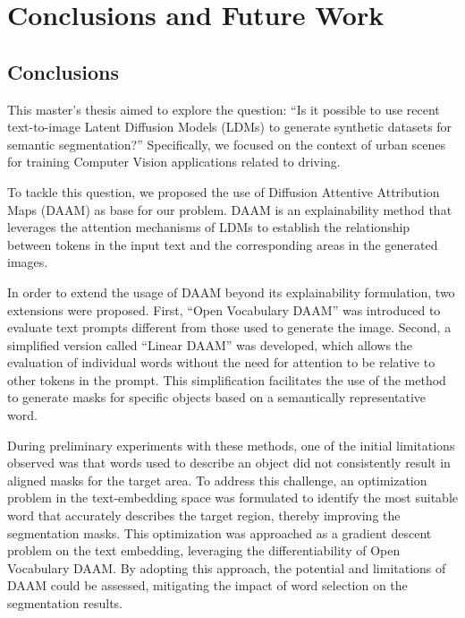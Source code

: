 \chapter{Conclusions and Future Work}
\label{cha:conclusions}

\section{Conclusions}

This master's thesis aimed to explore the question: ``Is it possible to use recent text-to-image Latent Diffusion Models (LDMs) to generate synthetic datasets for semantic segmentation?'' Specifically, we focused on the context of urban scenes for training Computer Vision applications related to driving.

To tackle this question, we proposed the use of Diffusion Attentive Attribution Maps (DAAM) as base for our problem. DAAM \cite{DAAM} is an explainability method that leverages the attention mechanisms of LDMs to establish the relationship between tokens in the input text and the corresponding areas in the generated images.

In order to extend the usage of DAAM beyond its explainability formulation, two extensions were proposed. First, ``Open Vocabulary DAAM'' was introduced to evaluate text prompts different from those used to generate the image. Second, a simplified version called ``Linear DAAM'' was developed, which allows the evaluation of individual words without the need for attention to be relative to other tokens in the prompt. This simplification facilitates the use of the method to generate masks for specific objects based on a semantically representative word.

During preliminary experiments with these methods, one of the initial limitations observed was that words used to describe an object did not consistently result in aligned masks for the target area. To address this challenge, an optimization problem in the text-embedding space was formulated to identify the most suitable word that accurately describes the target region, thereby improving the segmentation masks. This optimization was approached as a gradient descent problem on the text embedding, leveraging the differentiability of Open Vocabulary DAAM. By adopting this approach, the potential and limitations of DAAM could be assessed, mitigating the impact of word selection on the segmentation results.

